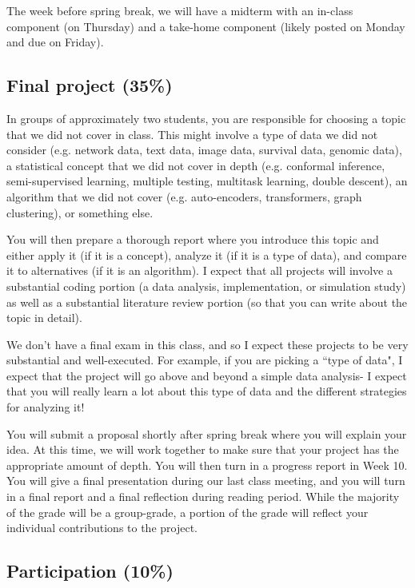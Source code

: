 \documentclass[11pt]{article}
\begin{document}
The week before spring break, we will have a midterm with an in-class component (on Thursday) and a take-home component (likely posted on Monday and due on Friday). 


\subsection{Final project (35\%)}

In groups of approximately two students, you are responsible for choosing a topic that we did not cover in class. This might involve a type of data we did not consider (e.g. network data, text data, image data, survival data, genomic data), a statistical concept that we did not cover in depth (e.g. conformal inference, semi-supervised learning, multiple testing, multitask learning, double descent), an algorithm that we did not cover (e.g. auto-encoders, transformers, graph clustering), or something else. 

You will then prepare a thorough report where you introduce this topic and either apply it (if it is a concept), analyze it (if it is a type of data), and compare it to alternatives (if it is an algorithm). I expect that all projects will involve a substantial coding portion (a data analysis, implementation, or simulation study) as well as a substantial literature review portion (so that you can write about the topic in detail). 

We don't have a final exam in this class, and so I expect these projects to be very substantial and well-executed. For example, if you are picking a ``type of data", I expect that the project will go above and beyond a simple data analysis- I expect that you will really learn a lot about this type of data and the different strategies for analyzing it!

You will submit a proposal shortly after spring break where you will explain your idea. At this time, we will work together to make sure that your project has the appropriate amount of depth. You will then turn in a progress report in Week 10. You will give a final presentation during our last class meeting, and you will turn in a final report and a final reflection during reading period. While the majority of the grade will be a group-grade, a portion of the grade will reflect your individual contributions to the project. 

\subsection{Participation (10\%)}
\end{document}
